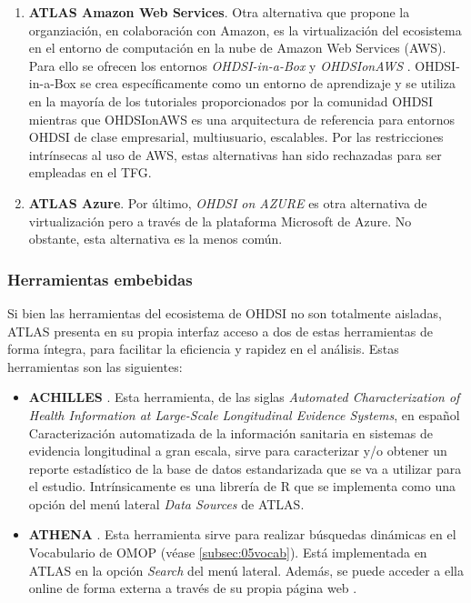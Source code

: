 \begin{enumerate}[label=\alph*.]
    \item \textbf{ATLAS Amazon Web Services}. Otra alternativa que propone la organziación, en colaboración con Amazon, es la virtualización del ecosistema en el entorno de computación en la nube de Amazon Web Services (AWS). Para ello se ofrecen los entornos \textit{OHDSI-in-a-Box} \cite{githubOHDSIBox} y \textit{OHDSIonAWS} \cite{githubOHDSIAWS}. OHDSI-in-a-Box se crea específicamente como un entorno de aprendizaje y se utiliza en la mayoría de los tutoriales proporcionados por la comunidad OHDSI mientras que OHDSIonAWS es una arquitectura de referencia para entornos OHDSI de clase empresarial, multiusuario, escalables. Por las restricciones intrínsecas al uso de AWS, estas alternativas han sido rechazadas para ser empleadas en el TFG.
    
    \item \textbf{ATLAS Azure}. Por último, \textit{OHDSI on AZURE} \cite{OHDSIonAzure} es otra alternativa de virtualización pero a través de la plataforma Microsoft de Azure. No obstante, esta alternativa es la menos común.
    
\end{enumerate}

\subsubsection{Herramientas embebidas}

Si bien las herramientas del ecosistema de OHDSI no son totalmente aisladas, ATLAS presenta en su propia interfaz acceso a dos de estas herramientas de forma íntegra, para facilitar la eficiencia y rapidez en el análisis. Estas herramientas son las siguientes:

\begin{itemize}

    \item \textbf{ACHILLES} \cite{githubACHILLES}. Esta herramienta, de las siglas \textit{Automated Characterization of Health Information at Large-Scale Longitudinal Evidence Systems}, en español Caracterización automatizada de la información sanitaria en sistemas de evidencia longitudinal a gran escala, sirve para caracterizar y/o obtener un reporte estadístico de la base de datos estandarizada que se va a utilizar para el estudio. Intrínsicamente es una librería de R que se implementa como una opción del menú lateral \textit{Data Sources} de ATLAS.
    \item \textbf{ATHENA} \cite{githubATHENA}. Esta herramienta sirve para realizar búsquedas dinámicas en el Vocabulario de OMOP (véase \ref{subsec:05vocab}). Está implementada en ATLAS en la opción \textit{Search} del menú lateral. Además, se puede acceder a ella online de forma externa a través de su propia página web \cite{ATHENAweb}.
    
\end{itemize}


